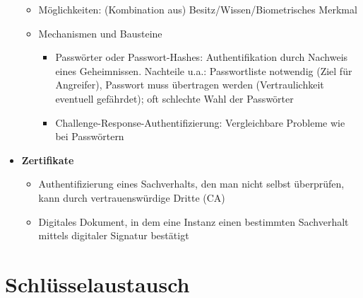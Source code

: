 \begin{itemize}
\begin{itemize}
		\item Möglichkeiten: (Kombination aus) Besitz/Wissen/Biometrisches Merkmal
		\item Mechanismen und Bausteine
		\begin{itemize}
			\item Passwörter oder Passwort-Hashes: Authentifikation durch Nachweis eines Geheimnissen. Nachteile u.a.: Passwortliste notwendig (Ziel für Angreifer), Passwort muss übertragen werden (Vertraulichkeit eventuell gefährdet); oft schlechte Wahl der Passwörter
			\item Challenge-Response-Authentifizierung: Vergleichbare Probleme wie bei Passwörtern
		\end{itemize}
	\end{itemize}
	\item \textbf{Zertifikate}
	\begin{itemize}
		\item Authentifizierung eines Sachverhalts, den man nicht selbst überprüfen, kann durch vertrauenswürdige Dritte (CA)
		\item Digitales Dokument, in dem eine Instanz einen bestimmten Sachverhalt mittels digitaler Signatur bestätigt
	\end{itemize}
\end{itemize}



\section{Schlüsselaustausch}

